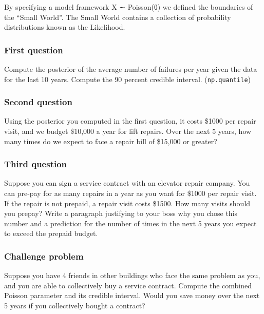 \documentclass[]{article}
\begin{document}
By specifying a model framework X ∼ Poisson(θ) we defined the boundaries
of the ``Small World''. The Small World contains a collection of
probability distributions known as the Likelihood.

\subsubsection{First question}

Compute the posterior of the average number of failures per year given
the data for the last 10 years. Compute the 90 percent credible
interval. (\texttt{np.quantile})

\hypertarget{second-question}{%
\subsubsection{Second question}\label{second-question}}

Using the posterior you computed in the first question, it costs \$1000
per repair visit, and we budget \$10,000 a year for lift repairs. Over
the next 5 years, how many times do we expect to face a repair bill of
\$15,000 or greater?

\hypertarget{third-question}{%
\subsubsection{Third question}\label{third-question}}

Suppose you can sign a service contract with an elevator repair company.
You can pre-pay for as many repairs in a year as you want for \$1000 per
repair visit. If the repair is not prepaid, a repair visit costs \$1500.
How many visits should you prepay? Write a paragraph justifying to your
boss why you chose this number and a prediction for the number of times
in the next 5 years you expect to exceed the prepaid budget.

\hypertarget{challenge-problem}{%
\subsubsection{Challenge problem}\label{challenge-problem}}

Suppose you have 4 friends in other buildings who face the same problem
as you, and you are able to collectively buy a service contract. Compute
the combined Poisson parameter and its credible interval. Would you save
money over the next 5 years if you collectively bought a contract?
\end{document}
